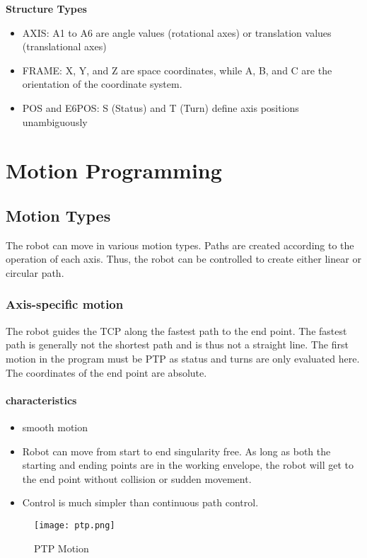\large {\textbf {Structure Types}}
\begin{itemize}
	\item AXIS: A1 to A6 are angle values (rotational axes) or translation values (translational axes)\\
\vspace{.2cm}
	\item FRAME: X, Y, and Z are space coordinates, while A, B, and C are the orientation of the coordinate system.\\

\item POS and E6POS:  S (Status) and T (Turn) define axis positions unambiguously\\
\end{itemize}

	\section{Motion Programming}
\subsection{Motion Types}
The robot can move in various motion types. Paths are created according to the operation of each axis. Thus, the robot can be controlled to create either linear or circular path.
\subsubsection{Axis-specific motion}
	   The robot guides the TCP along the fastest path to the end point. The fastest path is generally not the shortest path and is thus not a straight line. The first motion in the program must be PTP as status and turns are only evaluated here.
	   The coordinates of the end point are absolute.
	   \paragraph{characteristics}
	   \begin{itemize}
	   	\item smooth motion
	   	\item Robot can move from start to end singularity free. As long as both the starting and ending points are in the working envelope, the robot will get to the end point without collision or sudden movement. 
	   	\item	Control is much simpler than continuous path control. 
	   \end{itemize}
   \begin{figure}[H]
   	\caption{PTP Motion}
   	\centering
   	\texttt{[image: ptp.png]}
   \end{figure} 
